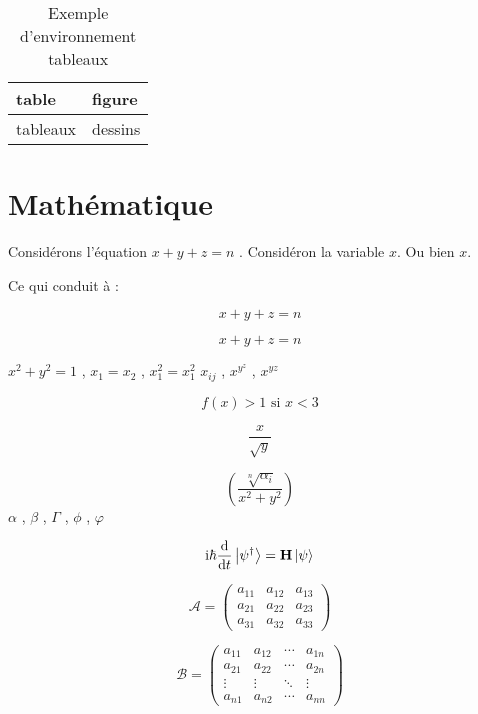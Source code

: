 \documentclass[a4paper,11pt]{article}
\begin{document}
\begin{table}[!htbp] %
\centering
\begin{tabular}{|l|l|}
\hline
table      & figure   \\
\hline
tableaux & dessins \\
\hline
\end{tabular}
\caption{Exemple d'environnement tableaux}
\label{tableau/exemple}
\end{table}

\section{Mathématique}
Considérons l'équation \begin{math} x + y + z = n \end{math} .
Considéron la variable $ x $. Ou bien \( x\).

Ce qui conduit à :

\begin{displaymath}
x + y + z = n
\end{displaymath}

\[
x+y+z=n
\]

$ x^2 +y^2=1 $ , $ x_1 = x_2 $ , $ x_1^2=x^2_1 $
$ x_{ij} $ , $ x^{y^z} $ , $ x^{yz} $

\[
f(x) > 1 \mbox{ si } x < 3 %
\]

\[
\frac{x}{\sqrt{y}}
\]

\[
\left (\frac{\sqrt[n]{\alpha_i}}{x^2+y^2}\right )
\]
$ \alpha $ , $\beta $ , $\Gamma$ , $\phi$ , $\varphi$

\[
\mathrm{i}\hbar\frac{\mathrm{d}}{\mathrm{d}t} \ket{\psi^\dagger}= \mathbf{H} \ket{\psi}
\]

\[
{\mathcal A} = \left (
\begin{array}{ccc}
a_{11} & a_{12} & a_{13} \\
a_{21} & a_{22} & a_{23} \\
a_{31} & a_{32} & a_{33}
\end{array}
\right )
\]

\[
{\mathcal B} = \left (
\begin{array}{cccc}
a_{11} & a_{12} & \cdots & a_{1n} \\
a_{21} & a_{22} & \cdots & a_{2n} \\
\vdots  & \vdots   & \ddots & \vdots  \\
a_{n1} & a_{n2} & \cdots & a_{nn}
\end{array}
\right )
\]
\end{document}
